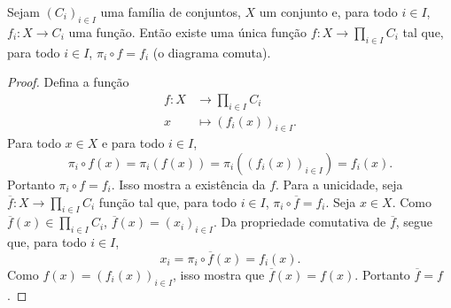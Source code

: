 \begin{prop}
Sejam $(C_i)_{i \in I}$ uma família de conjuntos, $X$ um conjunto e, para todo $i \in I$, $f_i: X \to C_i$ uma função. Então existe uma única função $f: X \to \prod_{i \in I} C_i$ tal que, para todo $i \in I$, $\pi_i \circ f = f_i$ (o diagrama comuta).
\begin{figure}[!h]
\centering
{}
\end{figure}
\end{prop}
\begin{proof}
Defina a função
	\begin{align*}
	f: X &\to \prod_{i \in I} C_i \\
		x &\mapsto (f_i(x))_{i \in I}.
	\end{align*}
Para todo $x \in X$ e para todo $i \in I$,
	\begin{equation*}
	\pi_i \circ f(x) = \pi_i (f(x)) = \pi_i ((f_i(x))_{i \in I}) = f_i(x).
	\end{equation*}
Portanto $\pi_i \circ f = f_i$. Isso mostra a existência da $f$. Para a unicidade, seja $\overline{f}: X \to \prod_{i \in I} C_i$ função tal que, para todo $i \in I$, $\pi_i \circ \overline{f} = f_i$. Seja $x \in X$.  Como $\overline{f}(x) \in \prod_{i \in I} C_i$, $\overline{f}(x) = (x_i)_{i \in I}$. Da propriedade comutativa de $\overline{f}$, segue que, para todo $i \in I$,
	\begin{equation*}
	x_i = \pi_i \circ \overline{f}(x) = f_i(x).
	\end{equation*}
Como $f(x) = (f_i(x))_{i \in I}$, isso mostra que $\overline{f}(x) = f(x)$. Portanto $\overline{f} = f$.
\end{proof}




